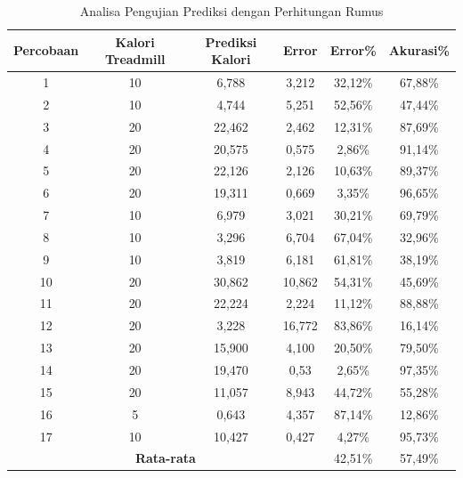 \begin{longtable}{|c|c|c|c|c|c|}
  \caption{Analisa Pengujian Prediksi dengan Perhitungan Rumus}
  \label{tb:AnalisaPrediksiPerhitungan}                                   \\
  \hline
  \rowcolor[HTML]{C0C0C0}
  \textbf{Percobaan} & \textbf{Kalori Treadmill} & \textbf{Prediksi Kalori} & \textbf{Error} & \textbf{Error\%} & \textbf{Akurasi\%} \\
  \hline
  1   & 10   & 6,788   & 3,212    & 32,12\%     & 67,88\%   \\
  \hline
  2   & 10   & 4,744   & 5,251    & 52,56\%     & 47,44\%   \\
  \hline
  3   & 20   & 22,462  & 2,462    & 12,31\%     & 87,69\%   \\
  \hline
  4   & 20   & 20,575  & 0,575    & 2,86\%      & 91,14\%   \\
  \hline
  5   & 20   & 22,126  & 2,126    & 10,63\%     & 89,37\%   \\
  \hline
  6   & 20   & 19,311  & 0,669    & 3,35\%      & 96,65\%   \\
  \hline
  7   & 10   & 6,979   & 3,021    & 30,21\%     & 69,79\%   \\
  \hline
  8   & 10   & 3,296   & 6,704    & 67,04\%     & 32,96\%   \\
  \hline
  9   & 10   & 3,819   & 6,181    & 61,81\%     & 38,19\%   \\
  \hline
  10   & 20   & 30,862  & 10,862   & 54,31\%     & 45,69\%   \\
  \hline
  11   & 20   & 22,224  & 2,224    & 11,12\%     & 88,88\%   \\
  \hline
  12   & 20   & 3,228   & 16,772   & 83,86\%     & 16,14\%   \\
  \hline
  13   & 20   & 15,900  & 4,100    & 20,50\%     & 79,50\%   \\
  \hline
  14   & 20   & 19,470  & 0,53     & 2,65\%      & 97,35\%   \\
  \hline
  15   & 20   & 11,057  & 8,943    & 44,72\%     & 55,28\%   \\
  \hline
  16   & 5    & 0,643   & 4,357    & 87,14\%     & 12,86\%   \\
  \hline
  17   & 10   & 10,427  & 0,427    & 4,27\%      & 95,73\%   \\
  \hline

  \multicolumn{4}{|c|}{\textbf{Rata-rata}} & 42,51\% & 57,49\% \\
  \hline
\end{longtable}

